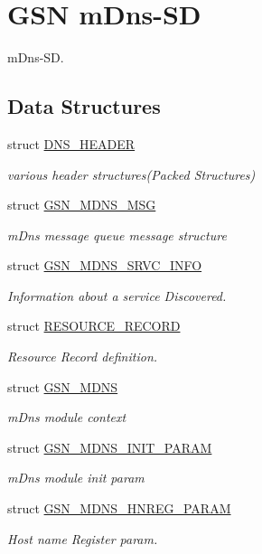 \hypertarget{a00668}{
\section{GSN mDns-\/SD}
\label{a00668}
}


mDns-\/SD.  


\subsection*{Data Structures}
\begin{DoxyCompactItemize}
\item 
struct \hyperlink{a00013}{DNS\_\-HEADER}
\begin{DoxyCompactList}\small\item\em various header structures(Packed Structures) \end{DoxyCompactList}\item 
struct \hyperlink{a00145}{GSN\_\-MDNS\_\-MSG}
\begin{DoxyCompactList}\small\item\em mDns message queue message structure \end{DoxyCompactList}\item 
struct \hyperlink{a00146}{GSN\_\-MDNS\_\-SRVC\_\-INFO}
\begin{DoxyCompactList}\small\item\em Information about a service Discovered. \end{DoxyCompactList}\item 
struct \hyperlink{a00457}{RESOURCE\_\-RECORD}
\begin{DoxyCompactList}\small\item\em Resource Record definition. \end{DoxyCompactList}\item 
struct \hyperlink{a00140}{GSN\_\-MDNS}
\begin{DoxyCompactList}\small\item\em mDns module context \end{DoxyCompactList}\item 
struct \hyperlink{a00144}{GSN\_\-MDNS\_\-INIT\_\-PARAM}
\begin{DoxyCompactList}\small\item\em mDns module init param \end{DoxyCompactList}\item 
struct \hyperlink{a00143}{GSN\_\-MDNS\_\-HNREG\_\-PARAM}
\begin{DoxyCompactList}\small\item\em Host name Register param. \end{DoxyCompactList}\item 

\end{DoxyCompactItemize}
